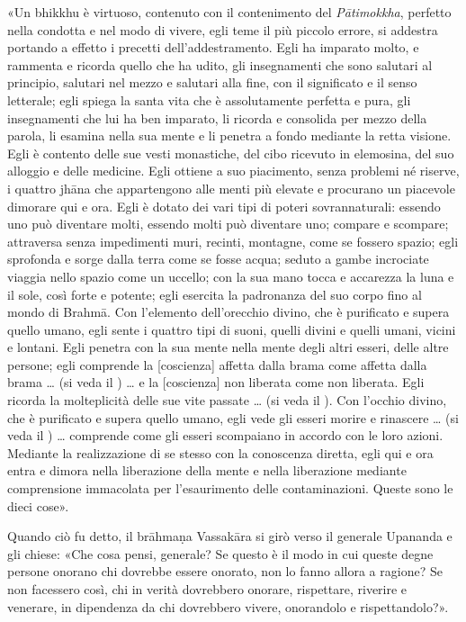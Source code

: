 «Un bhikkhu è virtuoso, contenuto con il contenimento del \emph{Pātimokkha},
perfetto nella condotta e nel modo di vivere, egli teme il più piccolo
errore, si addestra portando a effetto i precetti dell’addestramento.
Egli ha imparato molto, e rammenta e ricorda quello che ha udito, gli
insegnamenti che sono salutari al principio, salutari nel mezzo e
salutari alla fine, con il significato e il senso letterale; egli spiega
la santa vita che è assolutamente perfetta e pura, gli insegnamenti che
lui ha ben imparato, li ricorda e consolida per mezzo della parola, li
esamina nella sua mente e li penetra a fondo mediante la retta visione.
Egli è contento delle sue vesti monastiche, del cibo ricevuto in
elemosina, del suo alloggio e delle medicine. Egli ottiene a suo
piacimento, senza problemi né riserve, i quattro jhāna che appartengono
alle menti più elevate e procurano un piacevole dimorare qui e ora. Egli
è dotato dei vari tipi di poteri sovrannaturali: essendo uno può
diventare molti, essendo molti può diventare uno; compare e scompare;
attraversa senza impedimenti muri, recinti, montagne, come se fossero
spazio; egli sprofonda e sorge dalla terra come se fosse acqua; seduto a
gambe incrociate viaggia nello spazio come un uccello; con la sua mano
tocca e accarezza la luna e il sole, così forte e potente; egli esercita
la padronanza del suo corpo fino al mondo di Brahmā. Con l’elemento
dell’orecchio divino, che è purificato e supera quello umano, egli sente
i quattro tipi di suoni, quelli divini e quelli umani, vicini e lontani.
Egli penetra con la sua mente nella mente degli altri esseri, delle
altre persone; egli comprende la [coscienza] affetta dalla brama come
affetta dalla brama … (si veda il \hyperlink{cap-12-La-Dottrina#pag272}{}) … e la [coscienza]
non liberata come non liberata. Egli ricorda la molteplicità delle sue
vite passate … (si veda il \hyperlink{cap-02-Lo-sforzo-per-l-illuminazione#pag27b}{}). Con l’occhio divino, che è
purificato e supera quello umano, egli vede gli esseri morire e
rinascere … (si veda il \hyperlink{cap-02-Lo-sforzo-per-l-illuminazione#pag28}{}) … comprende come gli esseri
scompaiano in accordo con le loro azioni. Mediante la realizzazione di
se stesso con la conoscenza diretta, egli qui e ora entra e dimora nella
liberazione della mente e nella liberazione mediante comprensione
immacolata per l’esaurimento delle contaminazioni. Queste sono le dieci
cose».


Quando ciò fu detto, il brāhmaṇa Vassakāra si girò verso il generale
Upananda e gli chiese: «Che cosa pensi, generale? Se questo è il modo in
cui queste degne persone onorano chi dovrebbe essere onorato, non lo
fanno allora a ragione? Se non facessero così, chi in verità dovrebbero
onorare, rispettare, riverire e venerare, in dipendenza da chi
dovrebbero vivere, onorandolo e rispettandolo?».



